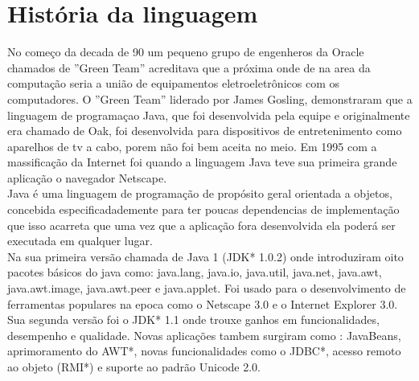 \section{História da linguagem}

No começo da decada de 90 um pequeno grupo de engenheros da Oracle chamados de ''Green Team'' acreditava que a próxima onde de na area da computação seria a união de equipamentos eletroeletrônicos com os computadores. O ''Green Team'' liderado por James Gosling, demonstraram que a linguagem de programaçao Java, que foi desenvolvida pela equipe e originalmente era chamado de Oak, foi desenvolvida para dispositivos de entretenimento como aparelhos de tv a cabo, porem não foi bem aceita no meio. Em 1995 com a massificação da Internet foi quando a linguagem Java teve sua primeira grande aplicação o navegador Netscape.\\

Java é uma linguagem de programação de propósito geral orientada a objetos, concebida especificadademente para ter poucas dependencias de implementação que isso acarreta que uma vez que a aplicação fora desenvolvida ela poderá ser executada em qualquer lugar.\\

Na sua primeira versão chamada de Java 1 (JDK* 1.0.2) onde introduziram oito pacotes básicos do java como: java.lang, java.io, java.util, java.net, java.awt, java.awt.image, java.awt.peer e java.applet. Foi usado para o desenvolvimento de ferramentas populares na epoca como o Netscape 3.0 e o Internet Explorer 3.0. \\

Sua segunda versão foi o JDK* 1.1 onde trouxe ganhos em funcionalidades, desempenho e qualidade. Novas aplicações tambem surgiram como : JavaBeans, aprimoramento do AWT*, novas funcionalidades como o JDBC*, acesso remoto ao objeto (RMI*) e suporte ao padrão Unicode 2.0.\\

